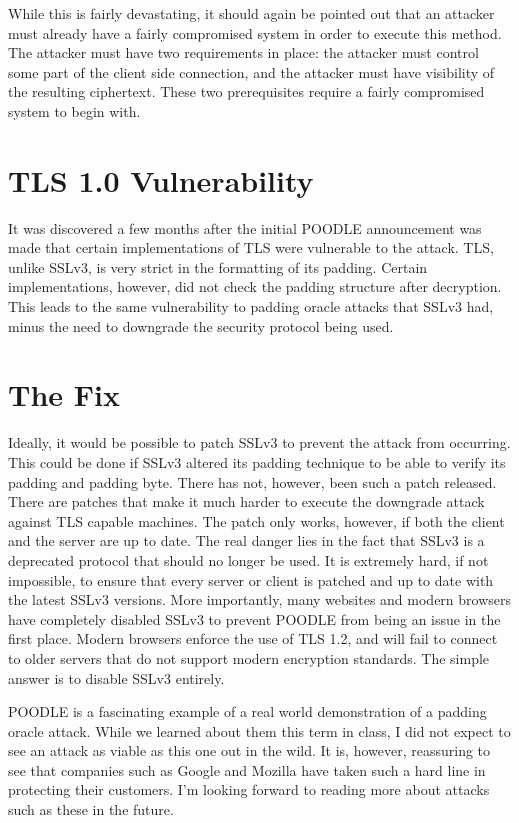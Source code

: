 \documentclass[10pt]{article}
\begin{document}
While this is fairly devastating, it should again be pointed out that an attacker
must already have a fairly compromised system in order to execute this method.
The attacker must have two requirements in place: the attacker must control
some part of the client side connection, and the attacker must have visibility
of the resulting ciphertext. These two prerequisites require a fairly
compromised system to begin with.\cite{US-CERT}

\section*{TLS 1.0 Vulnerability}
It was discovered a few months after the initial POODLE announcement was made
that certain implementations of TLS were vulnerable to the attack. TLS, unlike
SSLv3, is very strict in the formatting of its padding. Certain implementations,
however, did not check the padding structure after decryption. This leads to the
same vulnerability to padding oracle attacks that SSLv3 had, minus the need to
downgrade the security protocol being used.\cite{POODLEBites}

\section*{The Fix}
Ideally, it would be possible to patch SSLv3 to prevent the attack from occurring.
This could be done if SSLv3 altered its padding technique to be able to verify
its padding and padding byte. There has not, however, been such a patch released.
There are patches that make it much harder to execute the downgrade attack against
TLS capable machines. The patch only works, however, if both the client and the
server are up to date.\cite{disablessl3} The real danger lies in the fact
that SSLv3 is a deprecated protocol that should no longer be used. It is
extremely hard, if not impossible, to ensure that every server or client is
patched and up to date with the latest SSLv3 versions. More importantly, many
websites and modern browsers have completely disabled SSLv3 to prevent POODLE
from being an issue in the first place. Modern browsers enforce the use of TLS
1.2, and will fail to connect to older servers that do not support modern
encryption standards. The simple answer is to disable SSLv3 entirely.

POODLE is a fascinating example of a real world demonstration of a padding oracle
attack. While we learned about them this term in class, I did not expect to see
an attack as viable as this one out in the wild. It is, however, reassuring to see that
companies such as Google and Mozilla have taken such a hard line in protecting
their customers. I'm looking forward to reading more about attacks such as these
in the future. 



\end{document}

